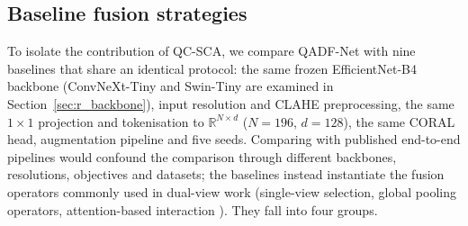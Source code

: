 \documentclass[final,5p,times,twocolumn,authoryear]{elsarticle}
\newcommand{\qadfnet}{QADF-Net}
\newcommand{\qcsca}{QC-SCA}
\theoremstyle{plain}
\theoremstyle{remark}
\begin{document}
\subsection{Baseline fusion strategies}
\label{sec:baselines}

To isolate the contribution of \qcsca{}, we compare \qadfnet{} with nine baselines that share an identical protocol: the same frozen EfficientNet-B4 backbone (ConvNeXt-Tiny and Swin-Tiny are examined in Section~\ref{sec:r_backbone}), input resolution and CLAHE preprocessing, the same $1\times1$ projection and tokenisation to $\mathbb{R}^{N\times d}$ ($N=196$, $d=128$), the same CORAL head, augmentation pipeline and five seeds. Comparing with published end-to-end pipelines would confound the comparison through different backbones, resolutions, objectives and datasets; the baselines instead instantiate the fusion operators commonly used in dual-view work (single-view selection, global pooling operators, attention-based interaction \citep{Zhao2019multiview,Sun2021dualview,Wang2021mvdr,Lu2019coattn}). They fall into four groups.
\end{document}
